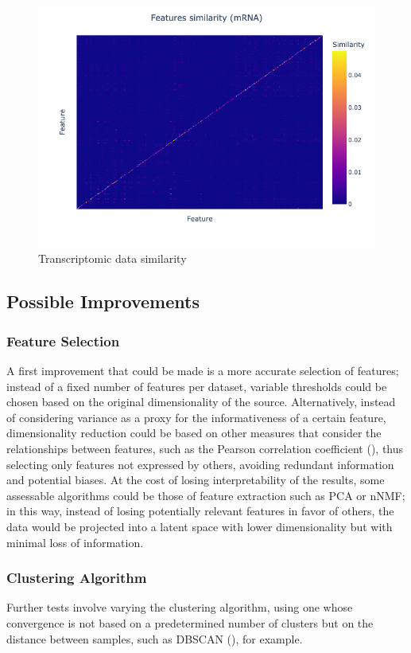 \documentclass[12pt,a4paper]{article}
\begin{document}
\begin{figure}[htbp!]
\begin{center}
\includegraphics[width=0.9\columnwidth]{./static/mRNA_similarity_heatmap.png}
\end{center}
\caption{Transcriptomic data similarity}
\label{fig:mRNA_similarity_heatmap}
\end{figure}

\subsection{Possible Improvements}
\subsubsection{Feature Selection}
A first improvement that could be made is a more accurate selection of features; instead of a fixed number of features per dataset, variable thresholds could be chosen based on the original dimensionality of the source. Alternatively, instead of considering variance as a proxy for the informativeness of a certain feature, dimensionality reduction could be based on other measures that consider the relationships between features, such as the Pearson correlation coefficient (\cite{Yule1907}), thus selecting only features not expressed by others, avoiding redundant information and potential biases. At the cost of losing interpretability of the results, some assessable algorithms could be those of feature extraction such as PCA or nNMF; in this way, instead of losing potentially relevant features in favor of others, the data would be projected into a latent space with lower dimensionality but with minimal loss of information.

\subsubsection{Clustering Algorithm}
Further tests involve varying the clustering algorithm, using one whose convergence is not based on a predetermined number of clusters but on the distance between samples, such as DBSCAN (\cite{Ester1996}), for example.
\end{document}
